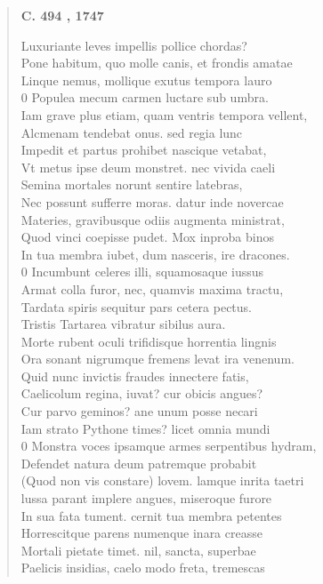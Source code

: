 \documentclass[11pt, a4paper]{report}
\begin{document}
\begin{verse}
     \marginpar{[53]} \begin{center} \textbf{C. 494 , 1747} \end{center}Luxuriante leves impellis pollice chordas? \\ Pone habitum, quo molle canis, et frondis amatae \\ Linque nemus, mollique exutus tempora lauro \\ 0 Populea mecum carmen luctare sub umbra. \\ Iam grave plus etiam, quam ventris tempora vellent, \\ Alcmenam tendebat onus. sed regia lunc \\ Impedit et partus prohibet nascique vetabat, \\ Vt metus ipse deum monstret. nec vivida caeli \\ Semina mortales norunt sentire latebras, \\ Nec possunt sufferre moras. datur inde novercae \\ Materies, gravibusque odiis augmenta ministrat, \\ Quod vinci coepisse pudet. Mox inproba binos \\ In tua membra iubet, dum nasceris, ire dracones. \\ 0 Incumbunt celeres illi, squamosaque iussus \\ Armat colla furor, nec, quamvis maxima tractu, \\ Tardata spiris sequitur pars cetera pectus. \\ Tristis Tartarea vibratur sibilus aura. \\ Morte rubent oculi trifidisque horrentia lingnis \\ Ora sonant nigrumque fremens levat ira venenum. \\ Quid nunc invictis fraudes innectere fatis, \\ Caelicolum regina, iuvat? cur obicis angues? \\ Cur parvo geminos? ane unum posse necari \\ Iam strato Pythone times? licet omnia mundi \\ 0 Monstra voces ipsamque armes serpentibus hydram, \\ Defendet natura deum patremque probabit \\ (Quod non vis constare) lovem. lamque inrita taetri \\ lussa parant implere angues, miseroque furore \\ In sua fata tument. cernit tua membra petentes \\ Horrescitque parens numenque inara creasse \\ Mortali pietate timet. nil, sancta, superbae \\ Paelicis insidias, caelo modo freta, tremescas \\ 

\end{verse}
\end{document}
